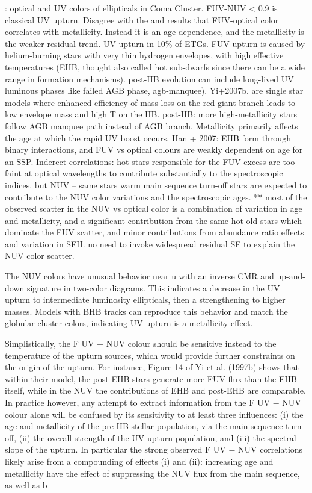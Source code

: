\citet{Smith+2012}: optical and UV colors of ellipticals in Coma Cluster. FUV-NUV < 0.9 is classical UV upturn. Disagree with the \citet{Burstein+1988} and \citet{Bureau+2011} results that FUV-optical color correlates with metallicity. Instead it is an age dependence, and the metallicity is the weaker residual trend. UV upturn in 10\% of ETGs. FUV upturn is caused by helium-burning stars with very thin hydrogen envelopes, with high effective temperatures (EHB, thought also called hot sub-dwarfs since there can be a wide range in formation mechanisms). post-HB evolution can include long-lived UV luminous phases like failed AGB phase, agb-manquee). Yi+2007b. are single star models where enhanced efficiency of mass loss on the red giant branch leads to low envelope mass and high T on the HB. post-HB: more high-metallicity stars follow AGB manquee path instead of AGB branch. Metallicity primarily affects the age at which the rapid UV boost occurs. Han + 2007: EHB form through binary interactions, and FUV vs optical colours are weakly dependent on age for an SSP. Inderect correlations: hot stars responsible for the FUV excess are too faint at optical wavelengths to contribute substantially to the spectroscopic indices. but NUV -- same stars warm main sequence turn-off stars are expected to contribute to the NUV color variations and the spectroscopic ages. ** most of the observed scatter in the NUV vs optical color is a combination of variation in age and metallicity, and a significant contribution from the same hot old stars which dominate the FUV scatter,  and minor contributions from abundance ratio effects and variation in SFH. no need to invoke widespread residual SF to explain the NUV color scatter.

\citet{Schombert} The NUV colors have unusual behavior near u with an
inverse CMR and up-and-down signature in two-color
diagrams. This indicates a decrease in the UV upturn to
intermediate luminosity ellipticals, then a strengthening
to higher masses. Models with BHB tracks can reproduce
this behavior and match the globular cluster colors,
indicating UV upturn is a metallicity effect.

Simplistically, the F UV − NUV colour should be sensitive
instead to the temperature of the upturn sources, which would provide
further constraints on the origin of the upturn. For instance,
Figure 14 of Yi et al. (1997b) shows that within their model, the
post-EHB stars generate more FUV flux than the EHB itself, while
in the NUV the contributions of EHB and post-EHB are comparable.
In practice however, any attempt to extract information from
the F UV − NUV colour alone will be confused by its sensitivity
to at least three influences: (i) the age and metallicity of the pre-HB
stellar population, via the main-sequence turn-off, (ii) the overall
strength of the UV-upturn population, and (iii) the spectral slope of
the upturn. In particular the strong observed F UV − NUV correlations
likely arise from a compounding of effects (i) and (ii):
increasing age and metallicity have the effect of suppressing the
NUV flux from the main sequence, as well as b


